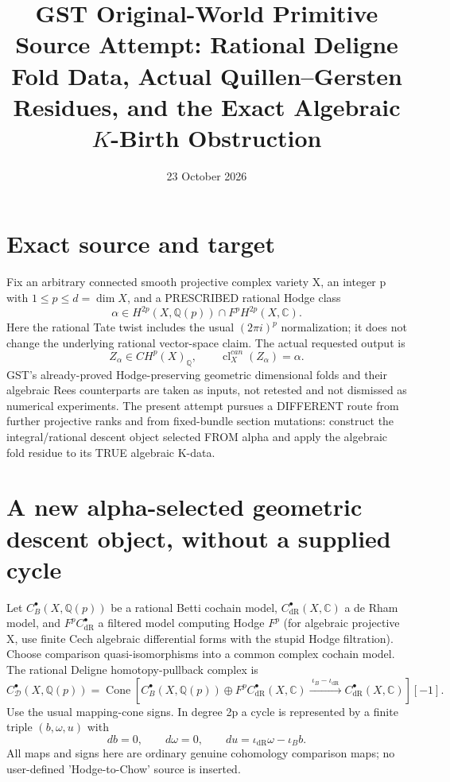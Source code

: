\documentclass[11pt]{article}
\title{GST Original-World Primitive Source Attempt:
Rational Deligne Fold Data, Actual Quillen--Gersten Residues,
and the Exact Algebraic \(K\)-Birth Obstruction}
\date{23 October 2026}
\begin{document}
\maketitle

\section{Exact source and target}
Fix an arbitrary connected smooth projective complex variety X,
an integer p with $1\le p\le d=\dim X$, and a
PRESCRIBED rational Hodge class
\[
 \alpha\in H^{2p}(X,\mathbb Q(p))\cap F^pH^{2p}(X,\mathbb C).
\]
Here the rational Tate twist includes the usual $(2\pi i)^p$
normalization; it does not change the underlying rational vector-space
claim. The actual requested output is
\[
 \boxed{Z_\alpha\in CH^p(X)_\mathbb Q,\qquad
  \operatorname{cl}^{can}_X(Z_\alpha)=\alpha.}
 \tag{1}
\]
GST's already-proved Hodge-preserving geometric dimensional folds and
their algebraic Rees counterparts are taken as inputs,
not retested and not dismissed as numerical experiments.
The present attempt pursues a DIFFERENT route from further
projective ranks and from fixed-bundle section mutations:
construct the integral/rational descent object selected FROM alpha
and apply the algebraic fold residue to its TRUE algebraic K-data.

\section{A new alpha-selected geometric descent object, without a supplied cycle}
Let $C_B^\bullet(X,\mathbb Q(p))$ be a rational Betti cochain model,
$C^\bullet_{\mathrm{dR}}(X,\mathbb C)$ a de Rham model, and
$F^pC^\bullet_{\mathrm{dR}}$ a filtered model computing Hodge $F^p$
(for algebraic projective X, use finite Cech algebraic differential
forms with the stupid Hodge filtration).
Choose comparison quasi-isomorphisms into a common complex cochain model.
The rational Deligne homotopy-pullback complex is
\[
 \boxed{
 C^\bullet_{\mathcal D}(X,\mathbb Q(p))
 =
 \operatorname{Cone}\!\left[
 C_B^\bullet(X,\mathbb Q(p))
 \oplus F^p C^\bullet_{\mathrm{dR}}(X,\mathbb C)
 \xrightarrow{\;\iota_B-\iota_{\mathrm{dR}}\;}
 C^\bullet_{\mathrm{dR}}(X,\mathbb C)
 \right][-1].
 }                                                       \tag{2}
\]
Use the usual mapping-cone signs. In degree 2p a cycle is
represented by a finite triple $(b,\omega,u)$ with
\[
 \boxed{
 db=0,\qquad d\omega=0,\qquad
 du=\iota_{\mathrm{dR}}\omega-\iota_B b .
 }                                                       \tag{3}
\]
All maps and signs here are ordinary genuine cohomology
comparison maps; no user-defined 'Hodge-to-Chow' source is inserted.
\end{document}
